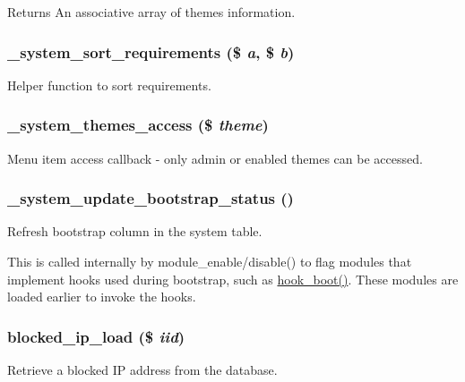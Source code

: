 \begin{DoxyReturn}{Returns}
An associative array of themes information. 
\end{DoxyReturn}
\hypertarget{system_8module_a7f01a6fc963253dd29b712a0b94d298c}{
\subsubsection[{\_\-system\_\-sort\_\-requirements}]{\setlength{\rightskip}{0pt plus 5cm}\_\-system\_\-sort\_\-requirements (\$ {\em a}, \/  \$ {\em b})}}
\label{system_8module_a7f01a6fc963253dd29b712a0b94d298c}
Helper function to sort requirements. \hypertarget{system_8module_a0428d3295fa8b31adf63c3d25c70d349}{
\subsubsection[{\_\-system\_\-themes\_\-access}]{\setlength{\rightskip}{0pt plus 5cm}\_\-system\_\-themes\_\-access (\$ {\em theme})}}
\label{system_8module_a0428d3295fa8b31adf63c3d25c70d349}
Menu item access callback -\/ only admin or enabled themes can be accessed. \hypertarget{system_8module_aef42ac3dd9a7dc00aa996206423a1837}{
\subsubsection[{\_\-system\_\-update\_\-bootstrap\_\-status}]{\setlength{\rightskip}{0pt plus 5cm}\_\-system\_\-update\_\-bootstrap\_\-status ()}}
\label{system_8module_aef42ac3dd9a7dc00aa996206423a1837}
Refresh bootstrap column in the system table.

This is called internally by module\_\-enable/disable() to flag modules that implement hooks used during bootstrap, such as \hyperlink{group__hooks_ga9ac1dfffdc69471a3d00d67503c71577}{hook\_\-boot()}. These modules are loaded earlier to invoke the hooks. \hypertarget{system_8module_a8cd6bf9052269e332d0a8863ad6f1608}{
\subsubsection[{blocked\_\-ip\_\-load}]{\setlength{\rightskip}{0pt plus 5cm}blocked\_\-ip\_\-load (\$ {\em iid})}}
\label{system_8module_a8cd6bf9052269e332d0a8863ad6f1608}
Retrieve a blocked IP address from the database.


